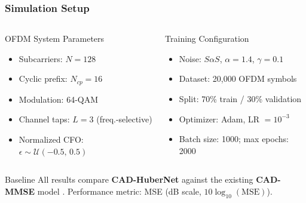 \documentclass[10pt]{beamer}
\begin{document}
\begin{frame}
\frametitle{Simulation Setup}

\begin{columns}[T]
    \begin{block}{OFDM System Parameters}
    \begin{itemize}
        \item Subcarriers: $N = 128$
        \item Cyclic prefix: $N_{cp} = 16$
        \item Modulation: 64-QAM
        \item Channel taps: $L = 3$ (freq.-selective)
        \item Normalized CFO: $\epsilon \sim \mathcal{U}(-0.5,\,0.5)$
    \end{itemize}
    \end{block}

    \begin{block}{Training Configuration}
    \begin{itemize}
        \item Noise: $S\alpha S$, $\alpha=1.4$, $\gamma=0.1$
        \item Dataset: 20{,}000 OFDM symbols
        \item Split: 70\% train / 30\% validation
        \item Optimizer: Adam, LR $= 10^{-3}$
        \item Batch size: 1000; max epochs: 2000
    \end{itemize}
    \end{block}
\end{columns}

\vspace{0.3cm}
\begin{block}{Baseline}
All results compare \textbf{CAD-HuberNet} against the existing \textbf{CAD-MMSE} model
\cite{chaudhari2023_cad}. Performance metric: MSE (dB scale, $10\log_{10}(\text{MSE})$).
\end{block}

\end{frame}
\end{document}
